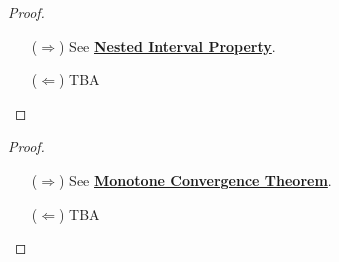 \documentclass[11pt,openany]{article}
\begin{document}
\begin{proof}
\begin{enumerate}
\item[($\Rightarrow$)] See \hyperlink{nip}{\textbf{Nested Interval Property}}.
\item[($\Leftarrow$)] TBA
\end{enumerate}
\end{proof}
\begin{proof}
\begin{enumerate}
\item[($\Rightarrow$)] See \hyperlink{mct}{\textbf{Monotone Convergence Theorem}}.
\item[($\Leftarrow$)] TBA
\end{enumerate}
\end{proof}
\end{document}
